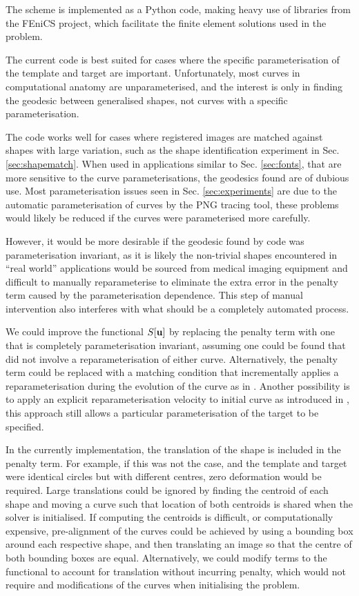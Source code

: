 \documentclass[a4paper, 12pt]{article}
\begin{document}
The scheme is implemented as a Python code, making heavy use of libraries from
the FEniCS project, which facilitate the finite element solutions used in the
problem.

The current code is best suited for cases where the specific parameterisation of the
template and target are important. Unfortunately, most curves in computational
anatomy are unparameterised, and the interest is only in finding the geodesic
between generalised shapes, not curves with a specific parameterisation.

The code works well for cases where registered images are matched against shapes
with large variation, such as the shape identification experiment in Sec.
\ref{sec:shapematch}. When used in applications similar to Sec. \ref{sec:fonts},
that are more sensitive to the curve parameterisations, the geodesics found are
of dubious use. Most parameterisation issues seen in Sec. \ref{sec:experiments}
are due to the automatic parameterisation of curves by the PNG tracing tool,
these problems would likely be reduced if the curves were parameterised more
carefully.

However, it would be more desirable if the geodesic found by code was
parameterisation invariant, as it is likely the non-trivial shapes encountered
in ``real world'' applications would be sourced from medical imaging equipment
and difficult to manually reparameterise to eliminate the extra error in the
penalty term caused by the parameterisation dependence. This step of manual
intervention also interferes with what should be a completely automated process.


We could improve the functional $S[\mathbf{u}]$ by replacing the penalty term with one that
is completely parameterisation invariant, assuming one could be found that did
not involve a reparameterisation of either curve. Alternatively, the penalty
term could be replaced with a matching condition that incrementally applies a
reparameterisation during the evolution of the curve as in
\cite{cotter2009geodesic}. Another possibility is to apply an explicit
reparameterisation velocity to initial curve as introduced in
\cite{clark2011reparam}, this approach still allows a particular
parameterisation of the target to be specified.


In the currently implementation, the translation of the shape is included in the
penalty term. For example, if this was not the case, and the template and target
were identical circles but with different centres, zero deformation would be
required. Large translations could be ignored by finding the centroid of each
shape and moving a curve such that location of both centroids is shared when the
solver is initialised. If computing the centroids is difficult, or
computationally expensive, pre-alignment of the curves could be achieved by
using a bounding box around each respective shape, and then translating an image
so that the centre of both bounding boxes are equal. Alternatively, we could
modify terms to the functional  to account for translation without
incurring penalty, which would not require and modifications of the curves when
initialising the problem.
\end{document}
